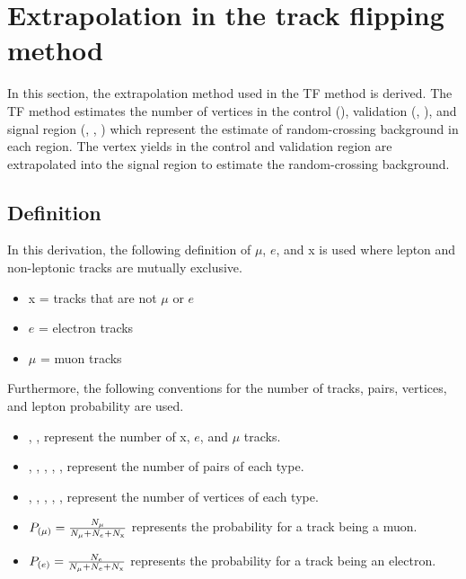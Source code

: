 \section{Extrapolation in the track flipping method}
In this section, the extrapolation method used in the TF method is derived. The TF method estimates the number of vertices in the control (\xx), validation (\mux, \ex), and signal region (\mumu, \ee, \emu) which represent the estimate of random-crossing background in each region. %
The vertex yields in the control and validation region are extrapolated into the signal region to estimate the random-crossing background.



\subsection{Definition}
In this derivation, the following definition of $\mu$, $e$, and x is used where lepton and non-leptonic tracks are mutually exclusive.
\begin{itemize}
\item x = tracks that are not $\mu$ or $e$
\item $e$ = electron tracks
\item $\mu$ = muon tracks 
\end{itemize}

Furthermore, the following conventions for the number of tracks, pairs, vertices, and lepton probability are used.
\begin{itemize}
\item \Nx, \Ne, \Nm represent the number of x, $e$, and $\mu$ tracks.
\item \Nxx, \Nmx, \Nex, \Nmm, \Nee, \Nem represent the number of pairs of each type.
\item \NVxx{}, \NVmx{}, \NVex{}, \NVmm{}, \NVee{}, \NVem{} represent the number of vertices of each type.
\item $P_{(\mu)}  = \frac{N_{\mu}}{N_{\mu} + N_{e} + N_{\mathrm{x}}}$ represents the probability for a track being a muon.
\item $P_{(e)}  = \frac{N_{e}}{N_{\mu} + N_{e} + N_{\mathrm{x}}}$ represents the probability for a track being an electron.
\end{itemize}


